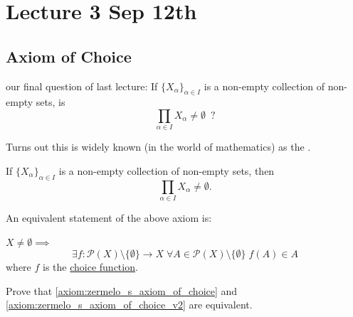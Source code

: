 \documentclass[notoc,notitlepage]{tufte-book}
\begin{document}


\chapter{Lecture 3 Sep 12th}%
\label{chp:lecture_3_sep_12th}

\section{Axiom of Choice}%
\label{sec:axiom_of_choice}

 our final question of last lecture: If ${\{ X_\alpha \}}_{\alpha \in I}$ is a non-empty collection of non-empty sets, is
\begin{equation*}
  \prod_{\alpha \in I} X_\alpha \neq \emptyset \enspace?
\end{equation*}

Turns out this is widely known (in the world of mathematics) as the .

\begin{axiom}\label{axiom:zermelo_s_axiom_of_choice}
  If ${\{ X_\alpha \}}_{\alpha \in I}$ is a non-empty collection of non-empty sets, then
  \begin{equation*}
    \prod_{\alpha \in I} X_\alpha \neq \emptyset.
  \end{equation*}
\end{axiom}

An equivalent statement of the above axiom is:

\begin{axiom}\label{axiom:zermelo_s_axiom_of_choice_v2}
  $X \neq \emptyset \implies$
  \begin{equation*}
    \exists f : \mathcal{P}(X) \setminus \{ \emptyset \} \to X \; \forall A \in \mathcal{P}(X) \setminus \{ \emptyset \} \; f(A) \in A
  \end{equation*}
  where $f$ is the \hyperref[defn:choice_function]{choice function}.
\end{axiom}

\begin{ex}
  Prove that \cref{axiom:zermelo_s_axiom_of_choice} and \cref{axiom:zermelo_s_axiom_of_choice_v2} are equivalent.
\end{ex}
\end{document}
